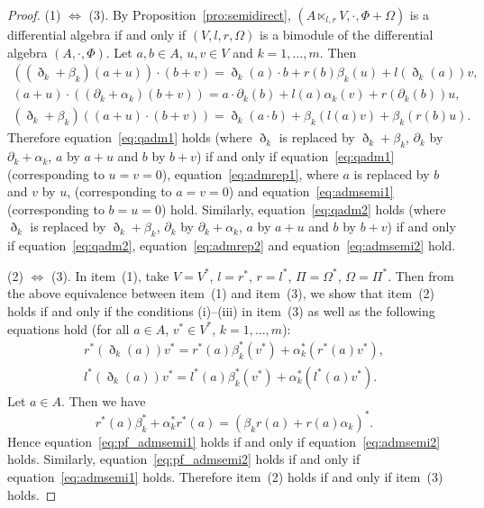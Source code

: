 \documentclass[pdftex]{sigma}
\numberwithin{equation}{section}
\begin{document}
\begin{proof}
 (1) $\iff$ (3).
 By Proposition~\ref{pro:semidirect}, $(A \ltimes_{l,r} V, \cdot, \Phi + \Omega)$ is a differential algebra if and only if
 $(V, l, r, \Omega)$ is a bimodule of the differential algebra $(A, \cdot, \Phi)$.
 Let $a, b \in A$, $u, v \in V$ and $k=1, \dots, m$. Then
 \begin{gather*}
 ((\eth_k + \beta_k)(a + u)) \cdot (b + v) = \eth_k(a) \cdot b + r(b)\beta_k(u) + l(\eth_k(a)) v, \\
 (a + u) \cdot ((\partial_k + \alpha_k)(b + v)) = a \cdot \partial_k(b) + l(a)\alpha_k(v) + r(\partial_k(b)) u, \\
 (\eth_k + \beta_k)((a + u)\cdot (b + v)) = \eth_k(a \cdot b) + \beta_k(l(a)v) + \beta_k(r(b)u).
 \end{gather*}
 Therefore equation~\eqref{eq:qadm1} holds (where $\eth_k$ is replaced by $\eth_k + \beta_k$, $\partial_k$ by $\partial_k + \alpha_k$, $a$ by $a + u$ and $b$ by $b + v$)
 if and only if equation~\eqref{eq:qadm1} (corresponding to $u = v = 0$), equation~\eqref{eq:admrep1}, where $a$ is replaced by $b$ and $v$ by $u$, (corresponding to $a = v = 0$) and equation~\eqref{eq:admsemi1} (corresponding to $b = u =0$) hold.
 Similarly, equation~\eqref{eq:qadm2} holds (where $\eth_k$ is replaced by $\eth_k + \beta_k$, $\partial_k$ by $\partial_k + \alpha_k$, $a$ by $a + u$ and $b$ by $b + v$)
 if and only if equation~\eqref{eq:qadm2}, equation~\eqref{eq:admrep2} and equation~\eqref{eq:admsemi2} hold.

 (2) $\iff$ (3).
 In item~(1), take $V = V^*$, $l = r^*$, $r = l^*$, $\Pi = \Omega^*$, $\Omega = \Pi^*$.
 Then from the above equivalence between item~(1) and item~(3),
 we show that item~(2) holds if and only if the conditions (i)--(iii) in item~(3)
 as well as the following equations hold (for all $a \in A$, $v^* \in V^*$, $k=1, \dots, m$):
 \begin{gather}
 r^*(\eth_k(a)) v^* = r^*(a) \beta_k^*(v^*) + \alpha_k^* (r^*(a)v^*), \label{eq:pf_admsemi1} \\
 l^*(\eth_k(a)) v^* = l^*(a) \beta_k^*(v^*) + \alpha_k^* (l^*(a)v^*). \label{eq:pf_admsemi2}
 \end{gather}
	Let $a \in A$. Then we have
	\begin{equation*}
		r^*(a) \beta_k^* + \alpha_k^* r^*(a) = ( \beta_k r(a) + r(a) \alpha_k)^*.
	\end{equation*}
	Hence equation~\eqref{eq:pf_admsemi1} holds if and only if equation~\eqref{eq:admsemi2} holds.
	Similarly, equation~\eqref{eq:pf_admsemi2} holds if and only if equation~\eqref{eq:admsemi1} holds.
	Therefore item~(2) holds if and only if item~(3) holds.
\end{proof}
\end{document}
